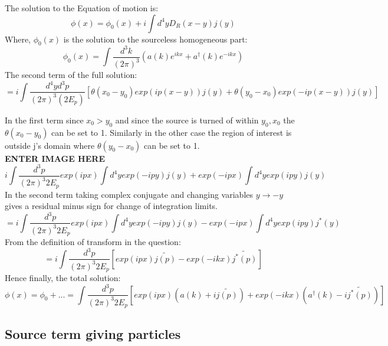 \documentclass[11pt]{article}
\begin{document}
	The solution to the Equation of motion is:
	\[
		\phi(x) = \phi_0(x) + i \int d^4y D_R(x-y)j(y)
	\]
	Where, $\phi_0(x)$ is the solution to the sourceless homogeneous part:
	\[
		\phi_0(x) = \int \frac{d^3k}{(2\pi)^3} (a(k)e^{ikx} + a^\dagger(k)e^{-ikx})
	\]
	The second term of the full solution:
	\[
		= i \int \frac{d^4y d^3p}{(2\pi)^3(2E_p)} [\theta(x_0 - y_0)exp(ip(x-y))j(y) + \theta(y_0-x_0)exp(-ip(x-y))j(y)]
	\]
	
	In the first term since $x_0>y_0$ and since the source is turned of within $y_0,x_0$ the $\theta(x_0-y_0)$ can be set to 1. Similarly in the other case the region of interest is outside j's domain where $\theta(y_0-x_0)$ can be set to 1.\\
	
	{\color{red}\textbf{ENTER IMAGE HERE}}\\
	\[
		i \int \frac{d^3p}{(2\pi)^3 2E_p} exp(ipx) \int d^4y exp(-ipy)j(y) + exp(-ipx)\int d^4y exp(ipy)j(y)
	\]
	In the second term taking complex conjugate and changing variables $y \rightarrow -y$ gives a residual minus sign for change of integration limits.
	\[
		= i \int \frac{d^3p}{(2\pi)^3 2E_p} exp(ipx) \int d^4y exp(-ipy)j(y) - exp(-ipx)\int d^4y exp(ipy)j^*(y)
	\]
	From the definition of transform in the question:
	\[
		= i \int \frac{d^3p}{(2\pi)^3 2E_p} [exp(ipx) \tilde{j(p)} - exp(-ikx)\tilde{j^*(p)}]
	\]
	Hence finally, the total solution:
	\[
		\boxed{\phi(x) = \phi_0 + ... = \int \frac{d^3p}{(2\pi)^3 2E_p} [exp(ipx) (a(k) + i\tilde{j(p)}) + exp(-ikx)(a^\dagger(k) - i\tilde{j^*(p)})]}
	\]
	
	\subsection{Source term giving particles}
	
	
	
\end{document}
